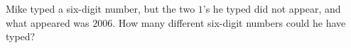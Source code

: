 Mike typed a six-digit number, but the two $1$'s he typed did not appear, and what appeared was $2006$. How many different six-digit numbers could he have typed?
